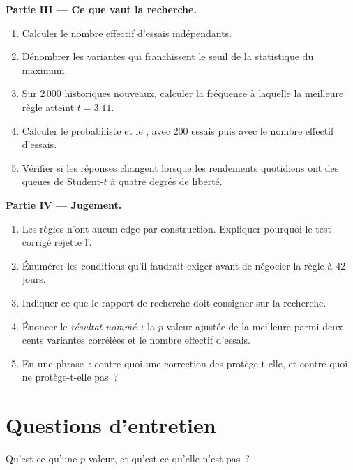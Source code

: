 \begin{problem}
\medskip\noindent\textbf{Partie III --- Ce que vaut la recherche.}
\begin{enumerate}[resume]
\item Calculer le nombre effectif d'essais indépendants.
\item Dénombrer les variantes qui franchissent le seuil de la statistique du maximum.
\item Sur 2\,000 historiques nouveaux, calculer la fréquence à laquelle la meilleure règle atteint $t = 3.11$.
\item Calculer le  probabiliste et le , avec 200 essais puis avec le nombre effectif d'essais.
\item Vérifier si les réponses changent lorsque les rendements quotidiens ont des queues de Student-$t$ à quatre degrés de liberté.
\end{enumerate}

\medskip\noindent\textbf{Partie IV --- Jugement.}
\begin{enumerate}[resume]
\item Les règles n'ont aucun edge par construction. Expliquer pourquoi le test corrigé rejette l'.
\item Énumérer les conditions qu'il faudrait exiger avant de négocier la règle à 42 jours.
\item Indiquer ce que le rapport de recherche doit consigner sur la recherche.
\item Énoncer le \emph{résultat nommé}~: la $p$-valeur ajustée de la meilleure parmi deux cents variantes corrélées et le nombre effectif
d'essais.
\item En une phrase~: contre quoi une correction des  protège-t-elle, et contre quoi ne protège-t-elle pas~?
\end{enumerate}
\end{problem}

\section{Questions d'entretien}

\begin{interviewq}\label{iq:qm:testing-and-multiple-testing:1}
Qu'est-ce qu'une $p$-valeur, et qu'est-ce qu'elle n'est pas~?
\end{interviewq}

